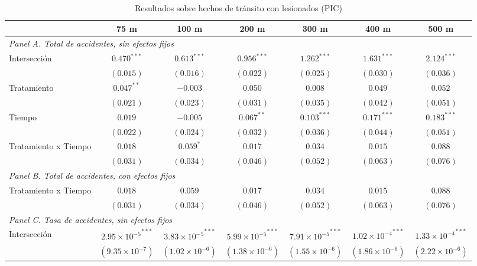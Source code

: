 \begin{table}[htbp]
    \centering
    \caption{Resultados sobre hechos de tránsito con lesionados (PIC)}
    \label{tab:results-main-pic}
    \footnotesize
    \begin{adjustbox}{max width=\textwidth}
    \begin{tabular}{lcccccc}
        \toprule
        & 75 m & 100 m & 200 m & 300 m & 400 m & 500 m \\
        \midrule
        \multicolumn{7}{l}{\textit{Panel A. Total de accidentes, sin efectos fijos}} \\
        Intersección & ${0.470}^{***}$ & ${0.613}^{***}$ & ${0.956}^{***}$ & ${1.262}^{***}$ & ${1.631}^{***}$ & ${2.124}^{***}$ \\
         & $(0.015)$ & $(0.016)$ & $(0.022)$ & $(0.025)$ & $(0.030)$ & $(0.036)$ \\
        Tratamiento & ${0.047}^{**}$ & $-0.003$ & $0.050$ & $0.008$ & $0.049$ & $0.052$ \\
         & $(0.021)$ & $(0.023)$ & $(0.031)$ & $(0.035)$ & $(0.042)$ & $(0.051)$ \\
        Tiempo & $0.019$ & $-0.005$ & ${0.067}^{**}$ & ${0.103}^{***}$ & ${0.171}^{***}$ & ${0.183}^{***}$ \\
         & $(0.022)$ & $(0.024)$ & $(0.032)$ & $(0.036)$ & $(0.044)$ & $(0.051)$ \\
        Tratamiento x Tiempo & $0.018$ & ${0.059}^{*}$ & $0.017$ & $0.034$ & $0.015$ & $0.088$ \\
         & $(0.031)$ & $(0.034)$ & $(0.046)$ & $(0.052)$ & $(0.063)$ & $(0.076)$ \\
        \midrule
        \multicolumn{7}{l}{\textit{Panel B. Total de accidentes, con efectos fijos}} \\
        Tratamiento x Tiempo & $0.018$ & $0.059$ & $0.017$ & $0.034$ & $0.015$ & $0.088$ \\
         & $(0.031)$ & $(0.034)$ & $(0.046)$ & $(0.052)$ & $(0.063)$ & $(0.076)$ \\
        \midrule
        \multicolumn{7}{l}{\textit{Panel C. Tasa de accidentes, sin efectos fijos}} \\
        Intersección & ${2.95 \times 10^{-5}}^{***}$ & ${3.83 \times 10^{-5}}^{***}$ & ${5.99 \times 10^{-5}}^{***}$ & ${7.91 \times 10^{-5}}^{***}$ & ${1.02 \times 10^{-4}}^{***}$ & ${1.33 \times 10^{-4}}^{***}$ \\
         & $(9.35 \times 10^{-7})$ & $(1.02 \times 10^{-6})$ & $(1.38 \times 10^{-6})$ & $(1.55 \times 10^{-6})$ & $(1.86 \times 10^{-6})$ & $(2.22 \times 10^{-6})$ \\

\end{tabular}
\end{adjustbox}
\end{table}
